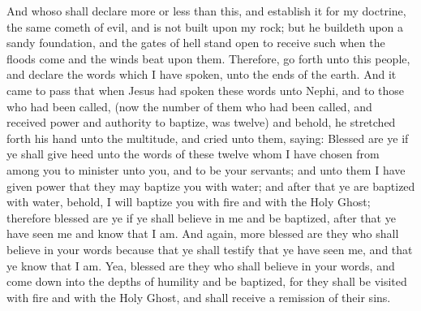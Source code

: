 And whoso shall declare more or less than this, and establish it for my doctrine, the same cometh of evil, and is not built upon my rock; but he buildeth upon a sandy foundation, and the gates of hell stand open to receive such when the floods come and the winds beat upon them.
\bverse \iffalse Therefore, go forth unto this people, and declare the words which I have spoken, unto the ends of the earth. \fi
Therefore, go forth unto this people, and declare the words which I have spoken, unto the ends of the earth.
\bchapter
\bverse \iffalse And it came to pass that when Jesus had spoken these words unto Nephi, and to those who had been called, (now the number of them who had been called, and received power and authority to baptize, was twelve) and behold, he stretched forth his hand unto the multitude, and cried unto them, saying: Blessed are ye if ye shall give heed unto the words of these twelve whom I have chosen from among you to minister unto you, and to be your servants; and unto them I have given power that they may baptize you with water; and after that ye are baptized with water, behold, I will baptize you with fire and with the Holy Ghost; therefore blessed are ye if ye shall believe in me and be baptized, after that ye have seen me and know that I am. \fi
And it came to pass that when Jesus had spoken these words unto Nephi, and to those who had been called, (now the number of them who had been called, and received power and authority to baptize, was twelve) and behold, he stretched forth his hand unto the multitude, and cried unto them, saying: Blessed are ye if ye shall give heed unto the words of these twelve whom I have chosen from among you to minister unto you, and to be your servants; and unto them I have given power that they may baptize you with water; and after that ye are baptized with water, behold, I will baptize you with fire and with the Holy Ghost; therefore blessed are ye if ye shall believe in me and be baptized, after that ye have seen me and know that I am.
\bverse \iffalse And again, more blessed are they who shall believe in your words because that ye shall testify that ye have seen me, and that ye know that I am. Yea, blessed are they who shall believe in your words, and come down into the depths of humility and be baptized, for they shall be visited with fire and with the Holy Ghost, and shall receive a remission of their sins. \fi
And again, more blessed are they who shall believe in your words because that ye shall testify that ye have seen me, and that ye know that I am. Yea, blessed are they who shall believe in your words, and come down into the depths of humility and be baptized, for they shall be visited with fire and with the Holy Ghost, and shall receive a remission of their sins.
